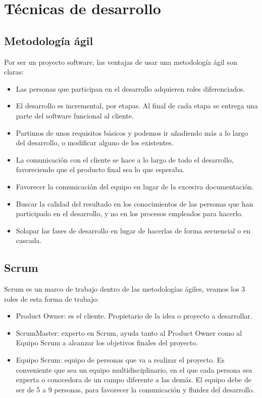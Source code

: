 
\section{Técnicas de desarrollo}

\subsection{Metodología ágil}
Por ser un proyecto software, las ventajas de usar una metodología ágil\cite{met_agil} son claras:

\begin{itemize}
	\item Las personas que participan en el desarrollo adquieren roles diferenciados.
	\item El desarrollo es incremental, por etapas. Al final de cada etapa se entrega una parte del software funcional al cliente.
	\item Partimos de unos requisitos básicos y podemos ir añadiendo más a lo largo del desarrollo, o modificar alguno de los existentes.
	\item La comunicación con el cliente se hace a lo largo de todo el desarrollo, favoreciendo que el producto final sea lo que esperaba.
	\item Favorecer la comunicación del equipo en lugar de la excesiva documentación.
	\item Buscar la calidad del resultado en los conocimientos de las personas que han participado en el desarrollo, y no en los procesos empleados para hacerlo.
	\item Solapar las fases de desarrollo en lugar de hacerlas de forma secuencial o en cascada.
\end{itemize}

\subsection{Scrum}
Scrum\cite{scrum} es un marco de trabajo dentro de las metodologías ágiles, veamos los 3 roles de esta forma de trabajo:

\begin{itemize}
	\item Product Owner: es el cliente. Propietario de la idea o proyecto a desarrollar. 
	\item ScrumMaster: experto en Scrum, ayuda tanto al Product Owner como al Equipo Scrum a alcanzar los objetivos finales del proyecto.
	\item Equipo Scrum: equipo de personas que va a realizar el proyecto. Es conveniente que sea un equipo multidisciplinario, en el que cada persona sea experta o conocedora de un campo diferente a las demás. El equipo debe de ser de 5 a 9 personas, para favorecer la comunicación y fluidez del desarrollo.
\end{itemize}

